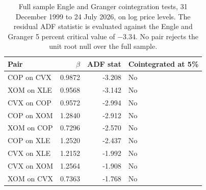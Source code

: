 \begin{table}[H]
\centering
\caption{Full sample Engle and Granger cointegration tests, 31 December 1999 to 24 July 2026, on log price levels. The residual ADF statistic is evaluated against the Engle and Granger 5 percent critical value of $-3.34$. No pair rejects the unit root null over the full sample.} 
\label{tab:eg_full}
\begin{tabular}{lrrl}
  \toprule
Pair & $\hat{\beta}$ & ADF stat & Cointegrated at 5\% \\ 
  \midrule
COP on CVX & 0.9872 & -3.208 & No \\ 
  XOM on XLE & 0.9568 & -3.142 & No \\ 
  CVX on COP & 0.9572 & -2.994 & No \\ 
  COP on XOM & 1.2840 & -2.912 & No \\ 
  XOM on COP & 0.7296 & -2.570 & No \\ 
  COP on XLE & 1.2520 & -2.437 & No \\ 
  CVX on XLE & 1.2152 & -1.992 & No \\ 
  CVX on XOM & 1.2564 & -1.908 & No \\ 
  XOM on CVX & 0.7363 & -1.768 & No \\ 
   \bottomrule
\end{tabular}
\end{table}

